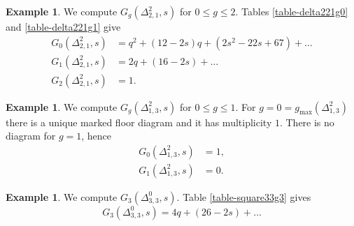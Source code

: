 \documentclass[11pt]{article}
\theoremstyle{definition}
\newtheorem{exam}[theo]{Example}
\numberwithin{equation}{section}
\newcommand{\gmax}{g_{\max}}
\theoremstyle{plain}
\begin{document}
\begin{exam} \label{ex-delta221}
We compute $G_g(\Delta^2_{2,1},s)$ for $0\leqslant g \leqslant 2$. Tables \ref{table-delta221g0} and \ref{table-delta221g1} give
\begin{align*}
    G_0(\Delta^2_{2,1},s) &=  q^2 + (12-2s)q + (2s^2-22s+67) + \dots \\
    G_1(\Delta^2_{2,1},s) &= 2q + (16-2s) + \dots\\
    G_2(\Delta^2_{2,1},s) &= 1. 
\end{align*} 
\end{exam}



\begin{exam} \label{ex-delta213}
We compute $G_g(\Delta^2_{1,3},s)$ for $0\leqslant g \leqslant 1$. For $g=0=\gmax(\Delta^2_{1,3})$ there is a unique marked floor diagram and it has multiplicity $1$. There is no diagram for $g=1$, hence
\begin{align*}
    G_0(\Delta^2_{1,3},s) &= 1, \\
    G_1(\Delta^2_{1,3},s) &= 0. 
\end{align*} 
\end{exam}



\begin{exam} \label{ex-square33}
We compute $G_3(\Delta^0_{3,3},s)$. Table \ref{table-square33g3} gives
\[ G_3(\Delta^0_{3,3},s) = 4q + (26-2s) + \dots  \]
\end{exam}
\end{document}
